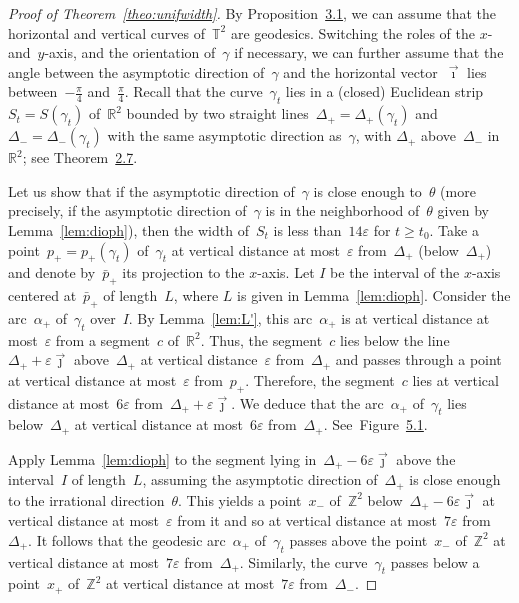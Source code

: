 \documentclass[10pt,a4paper]{amsart}
\numberwithin{equation}{section}
\newcommand{\Z}{\mathbb{Z}}
\newcommand{\R}{\mathbb{R}}
\newcommand{\T}{\mathbb{T}}
\begin{document}
\begin{proof}[Proof of Theorem~\ref{theo:unifwidth}]
By Proposition~\href{https://ahl.centre-mersenne.org/item/AHL_2024__7__1131_0/}{3.1}, we can assume that the horizontal and vertical curves of~$\T^2$ are geodesics. Switching the roles of the $x$- and~$y$-axis, and the orientation of~$\gamma$ if necessary, we can further assume that the angle between the asymptotic direction of~$\gamma$ and the horizontal vector~$\vec{\imath}$ lies between~$-\frac{\pi}{4}$ and~$\frac{\pi}{4}$. Recall that the curve~$\gamma_t$ lies in a (closed) Euclidean strip~$S_t=S(\gamma_t)$ of~$\R^2$ bounded by two straight lines~$\Delta_+=\Delta_+(\gamma_t)$ and~$\Delta_-=\Delta_-(\gamma_t)$ with the same asymptotic direction as~$\gamma$, with $\Delta_+$ above~$\Delta_-$ in~$\R^2$; see Theorem~\href{https://ahl.centre-mersenne.org/item/AHL_2024__7__1131_0/}{2.7}.

Let us show that if the asymptotic direction of~$\gamma$ is close enough to~$\theta$ (more precisely, if the asymptotic direction of~$\gamma$ is in the neighborhood of~$\theta$ given by Lemma~\ref{lem:dioph}), then the width of~$S_t$ is less than~$14\varepsilon$ for $t \geq t_0$. Take a point~$p_+=p_{+}(\gamma_t)$ of~$\gamma_t$ at vertical distance at most~$\varepsilon$ from~$\Delta_+$ (below~$\Delta_+$) and denote by~$\bar{p}_+$ its projection to the $x$-axis. Let $I$ be the interval of the $x$-axis centered at~$\bar{p}_+$ of length~$L$, where $L$ is given in Lemma~\ref{lem:dioph}. Consider the arc~$\alpha_+$ of~$\gamma_t$ over~$I$. By Lemma~\ref{lem:L'}, this arc~$\alpha_+$ is at vertical distance at most~$\varepsilon$ from a segment~$c$ of~$\R^2$. Thus, the segment~$c$ lies below the line~$\Delta_+ +\varepsilon \vec{\jmath}$ above~$\Delta_+$ at vertical distance~$\varepsilon$ from~$\Delta_+$ and passes through a point at vertical distance at most~$\varepsilon$ from~$p_+$. Therefore, the segment~$c$ lies at vertical distance at most~$6\varepsilon$ from~$\Delta_++\varepsilon \vec{\jmath}$. We deduce that the arc~$\alpha_+$ of~$\gamma_t$ lies below~$\Delta_+$ at vertical distance at most~$6\varepsilon$ from~$\Delta_+$. See~Figure~\href{https://ahl.centre-mersenne.org/item/AHL_2024__7__1131_0/}{5.1}. 



Apply Lemma~\ref{lem:dioph} to the segment lying in~$\Delta_+ - 6 \varepsilon \vec{\jmath}$ above the interval~$I$ of length~$L$, assuming the asymptotic direction of~$\Delta_+$ is close enough to the irrational direction~$\theta$. This yields a point~$x_-$ of~$\Z^2$ below~$\Delta_+-6 \varepsilon \vec{\jmath}$ at vertical distance at most~$\varepsilon$ from it and so at vertical distance at most~$7\varepsilon$ from~$\Delta_+$. It follows that the geodesic arc~$\alpha_+$ of~$\gamma_t$ passes above the point~$x_-$ of~$\Z^2$ at vertical distance at most~$7\varepsilon$ from~$\Delta_+$. Similarly, the curve~$\gamma_t$ passes below a point~$x_+$ of~$\Z^2$ at vertical distance at most~$7\varepsilon$ from~$\Delta_-$.


\end{proof}
\end{document}
